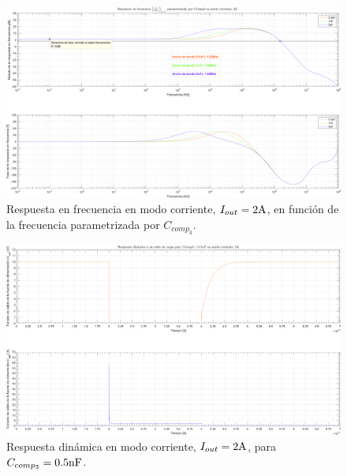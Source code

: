 \begin{figure}[H] %
\begin{center}
\includegraphics[width=1.1 \textwidth, angle=90]{./img/plots/rf/power_supply_CCOMP3_RF_Modo3.png}
\caption{\label{fig:fig_power_supply_CCOMP3_RF_Modo3}\footnotesize{Respuesta en frecuencia en modo corriente, $I_{out} = 2 \si[per-mode=symbol]{\ampere}$, en función de la frecuencia parametrizada por $C_{comp_{3}}$.}}
\end{center}
\end{figure}

\clearpage

\begin{figure}[H] %
\begin{center}
\includegraphics[width=1.1 \textwidth, angle=90]{./img/plots/dynamic/power_supply_CCOMP3_0_5n_STEP_Modo3.png}
\caption{\label{fig:fig_power_supply_CCOMP3_STEP_0_5n_Modo3}\footnotesize{Respuesta dinámica en modo corriente, $I_{out} = 2 \si[per-mode=symbol]{\ampere}$, para $C_{comp_{3}} = 0.5 \si[per-mode=symbol]{\nano\farad} $.}}
\end{center}
\end{figure}

